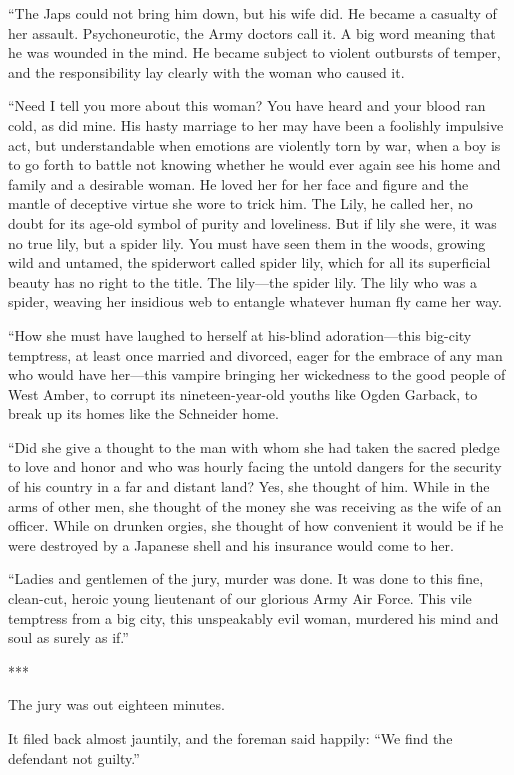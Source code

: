 {“The Japs could not bring him down, but his wife did. He became a casualty of her assault. Psychoneurotic, the Army doctors call it. A big word meaning that he was wounded in the mind. He became subject to violent outbursts of temper, and the responsibility lay clearly with the woman who caused it.

“Need I tell you more about this woman? You have heard and your blood ran cold, as did mine. His hasty marriage to her may have been a foolishly impulsive act, but understandable when emotions are violently torn by war, when a boy is to go forth to battle not knowing whether he would ever again see his home and family and a desirable woman. He loved her for her face and figure and the mantle of deceptive virtue she wore to trick him. The Lily, he called her, no doubt for its age-old symbol of purity and loveliness. But if lily she were, it was no true lily, but a spider lily. You must have seen them in the woods, growing wild and untamed, the spiderwort called spider lily, which for all its superficial beauty has no right to the title. The lily—the spider lily. The lily who was a spider, weaving her insidious web to entangle whatever human fly came her way.

“How she must have laughed to herself at his-blind adoration—this big-city temptress, at least once married and divorced, eager for the embrace of any man who would have her—this vampire bringing her wickedness to the good people of West Amber, to corrupt its nineteen-year-old youths like Ogden Garback, to break up its homes like the Schneider home.

“Did she give a thought to the man with whom she had taken the sacred pledge to love and honor and who was hourly facing the untold dangers for the security of his country in a far and distant land? Yes, she thought of him. While in the arms of other men, she thought of the money she was receiving as the wife of an officer. While on drunken orgies, she thought of how convenient it would be if he were destroyed by a Japanese shell and his insurance would come to her.

“Ladies and gentlemen of the jury, murder was done. It was done to this fine, clean-cut, heroic young lieutenant of our glorious Army Air Force. This vile temptress from a big city, this unspeakably evil woman, murdered his mind and soul as surely as if.”

***

The jury was out eighteen minutes.

It filed back almost jauntily, and the foreman said happily: “We find the defendant not guilty.”

}

